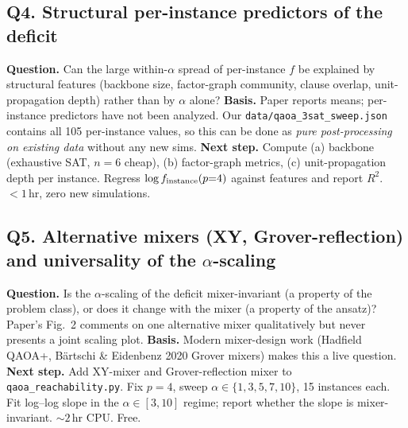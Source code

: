 \subsection*{Q4. Structural per-instance predictors of the deficit}
\textbf{Question.} Can the large within-\(\alpha\) spread of
per-instance \(f\) be explained by structural features (backbone
size, factor-graph community, clause overlap, unit-propagation depth)
rather than by \(\alpha\) alone?
\textbf{Basis.} Paper reports means; per-instance predictors have not
been analyzed. Our
\texttt{data/qaoa\_3sat\_sweep.json} contains all 105 per-instance
values, so this can be done as \emph{pure post-processing on existing
data} without any new sims.
\textbf{Next step.} Compute (a) backbone (exhaustive SAT, \(n=6\)
cheap), (b) factor-graph metrics, (c) unit-propagation depth per
instance. Regress \(\log f_{\rm instance}(p{=}4)\) against features
and report \(R^2\). \(<1\)\,hr, zero new simulations.

\subsection*{Q5. Alternative mixers (XY, Grover-reflection) and universality of the $\alpha$-scaling}
\textbf{Question.} Is the \(\alpha\)-scaling of the deficit
mixer-invariant (a property of the problem class), or does it change
with the mixer (a property of the ansatz)? Paper's Fig.~2 comments on
one alternative mixer qualitatively but never presents a joint
scaling plot.
\textbf{Basis.} Modern mixer-design work (Hadfield QAOA+, Bärtschi \&
Eidenbenz 2020 Grover mixers) makes this a live question.
\textbf{Next step.} Add XY-mixer and Grover-reflection mixer to
\texttt{qaoa\_reachability.py}. Fix \(p=4\), sweep \(\alpha\in\{1,3,5,7,10\}\),
15 instances each. Fit log--log slope in the \(\alpha\in[3,10]\)
regime; report whether the slope is mixer-invariant. \(\sim 2\)\,hr
CPU. Free.
